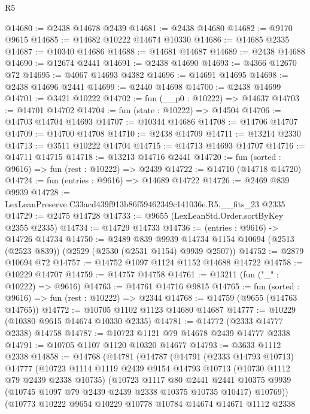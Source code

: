 \begin{lexlean}{R5}
\begin{coremodule}
@14680 := @2438 @14678 @2439
@14681 := @2438 @14680
@14682 := @9170 @9615
@14685 := @14682 @10222 @14674 @10330
@14686 := @14685 @2335
@14687 := @10340 @14686
@14688 := @14681 @14687
@14689 := @2438 @14688
@14690 := @12674 @2441
@14691 := @2438 @14690
@14693 := @4366 @12670 @72
@14695 := @4067 @14693 @4382
@14696 := @14691 @14695
@14698 := @2438 @14696 @2441
@14699 := @2440 @14698
@14700 := @2438 @14699
@14701 := @3421 @10222
@14702 := fun (__p0 : @10222) => @14637
@14703 := @14701 @14702
@14704 := fun (state : @10222) => @14504
@14706 := @14703 @14704 @14693
@14707 := @10344 @14686
@14708 := @14706 @14707
@14709 := @14700 @14708
@14710 := @2438 @14709
@14711 := @13214 @2330
@14713 := @3511 @10222 @14704
@14715 := @14713 @14693 @14707
@14716 := @14711 @14715
@14718 := @13213 @14716 @2441
@14720 := fun (sorted : @9616) => fun (rest : @10222) => @2439
@14722 := @14710 (@14718 @14720)
@14724 := fun (entries : @9616) => @14689 @14722
@14726 := @2469 @839 @9939
@14728 := LexLeanPreserve.C33acd439f913b86f59462349c141036e.R5.__fits_23 @2335
@14729 := @2475 @14728
@14733 := @9655 (LexLeanStd.Order.sortByKey @2355 @2335)
@14734 := @14729 @14733
@14736 := (entries : @9616) -> @14726 @14734
@14750 := @2489
    @839
    @9939
    @14734
    @1154
    @10694
    (@2513 (@2523 @839))
    (@2529 (@2530 (@2531 @1154) @9939 @2507))
@14752 := @2879 @10694 @72
@14757 := @14752 @1097 @1124 @1152 @14688 @14722
@14758 := @10229 @14707
@14759 := @14757 @14758
@14761 := @13211 (fun ("_" : @10222) => @9616)
@14763 := @14761 @14716 @9815
@14765 := fun (sorted : @9616) => fun (rest : @10222) => @2344
@14768 := @14759 (@9655 (@14763 @14765))
@14772 := @10705 @1102 @1123 @14680 @14687
@14777 := @10229 (@10380 @9615 @14674 @10330 @2335)
@14781 := @14772 (@2333 @14777 @2338) @14758
@14787 := @10723 @1121 @79 @14678 @2439 @14777 @2338
@14791 := @10705 @1107 @1120 @10320 @14677
@14793 := @3633 @1112 @2338
@14858 := @14768
    (@14781
      (@14787
        (@14791
          (@2333 @14793 @10713)
          @14777
          (@10723
            @1114
            @1119
            @2439
            @9154
            @14793
            @10713
            (@10730 @1112 @79 @2439 @2338 @10735)
            (@10723
              @1117
              @80
              @2441
              @2441
              @10375
              @9939
              (@10745 @1097 @79 @2439 @2439 @2338 @10375 @10735 @10417)
              @10769))
          (@10773
            @10222
            @9654
            @10229
            @10778
            @10784
            @14674
            @14671
            @1112
            @2338

\end{coremodule}
\end{lexlean}
